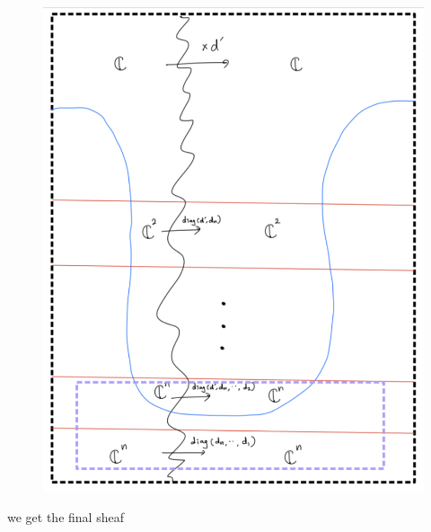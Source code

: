 \begin{enumerate}[label = (\roman*)]
\begin{enumerate}[label = (Step \arabic*)]
\begin{figure}[H]
    \centering
    \includegraphics[scale = 0.95]{diagrams/cobord5/6.png}
    \caption{}
    \label{fig:your-label}
\end{figure}
\pagebreak 
we get the final sheaf


\end{enumerate}
\end{enumerate}
